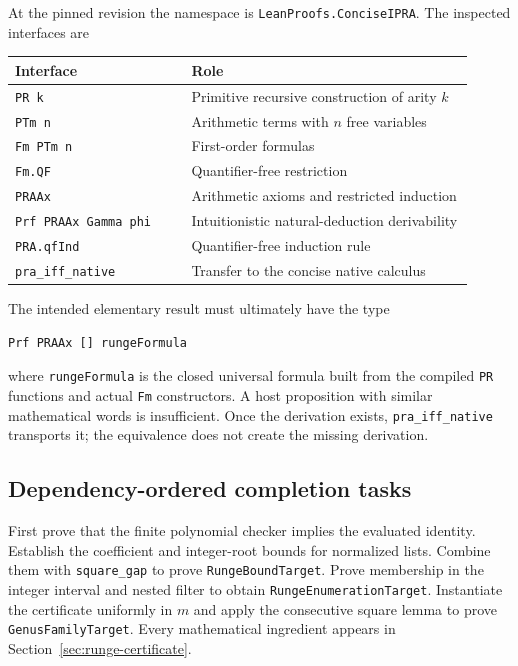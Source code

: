 At the pinned revision the namespace is
\texttt{LeanProofs.ConciseIPRA}. The inspected interfaces are
\begin{center}
\begin{tabular}{@{}p{0.35\linewidth}p{0.56\linewidth}@{}}
\toprule
Interface & Role\\
\midrule
\texttt{PR k} & Primitive recursive construction of arity $k$\\
\texttt{PTm n} & Arithmetic terms with $n$ free variables\\
\texttt{Fm PTm n} & First-order formulas\\
\texttt{Fm.QF} & Quantifier-free restriction\\
\texttt{PRAAx} & Arithmetic axioms and restricted induction\\
\texttt{Prf PRAAx Gamma phi} & Intuitionistic natural-deduction derivability\\
\texttt{PRA.qfInd} & Quantifier-free induction rule\\
\texttt{pra\_iff\_native} & Transfer to the concise native calculus\\
\bottomrule
\end{tabular}
\end{center}

The intended elementary result must ultimately have the type
\begin{lstlisting}
Prf PRAAx [] rungeFormula
\end{lstlisting}
where \texttt{rungeFormula} is the closed universal formula built
from the compiled \texttt{PR} functions and actual \texttt{Fm}
constructors. A host proposition with similar mathematical words
is insufficient. Once the derivation exists,
\texttt{pra\_iff\_native} transports it; the equivalence does not
create the missing derivation.

\subsection{Dependency-ordered completion tasks}

First prove that the finite polynomial checker implies the evaluated
identity. Establish the coefficient and integer-root bounds for
normalized lists. Combine them with \texttt{square\_gap} to prove
\texttt{RungeBoundTarget}. Prove membership in the integer interval
and nested filter to obtain \texttt{RungeEnumerationTarget}.
Instantiate the certificate uniformly in $m$ and apply the consecutive
square lemma to prove \texttt{GenusFamilyTarget}. Every mathematical
ingredient appears in Section~\ref{sec:runge-certificate}.

